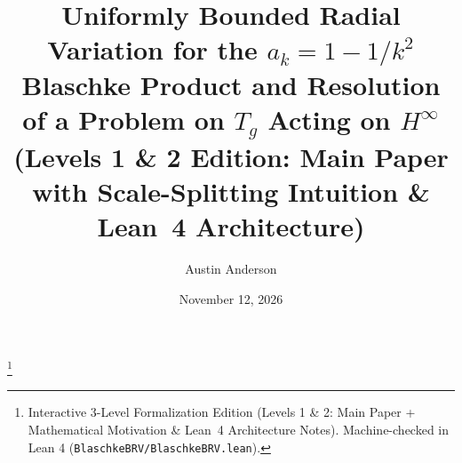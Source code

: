 \documentclass[11pt,reqno]{amsart}
\numberwithin{equation}{section}
\begin{document}
\sloppy

\title[Bounded Radial Variation for the $1 - 1/k^2$ Blaschke Product]
{Uniformly Bounded Radial Variation for the $a_k = 1 - 1/k^2$ Blaschke Product and Resolution of a Problem on $T_g$ Acting on $H^\infty$\\
{\small (Levels 1 \& 2 Edition: Main Paper with Scale-Splitting Intuition \& Lean~4 Architecture)}}
\date{November 12, 2026}

\author[A. Anderson]{Austin Anderson}

\thanks{Interactive 3-Level Formalization Edition (Levels 1 \& 2: Main Paper + Mathematical Motivation \& Lean~4 Architecture Notes). Machine-checked in Lean 4 (\texttt{BlaschkeBRV/BlaschkeBRV.lean}).}
\end{document}
